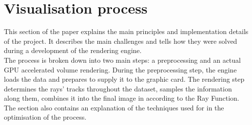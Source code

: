 \documentclass[twoside, english, 11pt]{report}
\begin{document}
\section{Visualisation process}

This section of the paper explains the main principles and implementation details of the project. It describes the main challenges and tells how they were solved during a development of the rendering engine.\\

The process is broken down into two main steps: a preprocessing and an actual GPU accelerated volume rendering. During the preprocessing step, the engine loads the data and prepares to supply it to the graphic card. The rendering step determines the rays' tracks throughout the dataset, samples the information along them, combines it into the final image in according to the Ray Function. The section also contains an explanation of the techniques used for in the optimisation of the process. 

\end{document}
